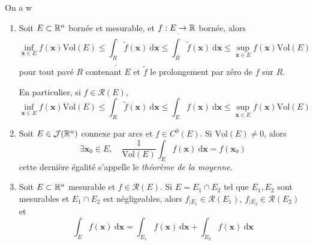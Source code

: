

\begin{thmbox}
	\begin{theorem}
		On a w
		\begin{enumerate}[start=5]
		
		\item Soit $E \subset \mathbb R^n$ bornée et mesurable, et $f : E \to \mathbb R$ bornée, alors
		\[
		\inf_{\bm x \in E} f(\bm x) \mathrm{Vol}(E) \leqslant \underline{\int_R} \tilde f(\bm x) ~\mathrm d \bm x \leqslant \overline{\int_R} \tilde f(\bm x) ~\mathrm d \bm x \leqslant \sup_{\bm x \in E} f(\bm x) \mathrm{Vol}(E)
		\]
		pour tout pavé $R$ contenant $E$ et $\tilde f$ le prolongement par zéro de $f$ sur $R$.
		
		En particulier, si $f \in \mathcal R(E)$,
		\[
		\inf_{\bm x \in E} f(\bm x) \mathrm{Vol}(E) \leqslant \int_R \tilde f(\bm x) ~\mathrm d \bm x \leqslant \int_E f(\bm x) ~\mathrm d \bm x \leqslant \sup_{\bm x \in E} f(\bm x) \mathrm{Vol}(E)
		\]
		\item Soit $E \in \mathcal J(\mathbb R^n)$ connexe par arcs et $f \in C^0(E)$. Si $\mathrm{Vol}(E) \neq 0$, alors
		\[
		\exists \bm x_0 \in E, \quad \frac{1}{\mathrm{Vol}(E)} \int_E f(\bm x)~\mathrm d \bm x = f(\bm x_0)
		\]
		cette dernière égalité s'appelle le \emph{théorème de la moyenne}.
		\item Soit $E \subset \mathbb R^n$ mesurable et $f \in \mathcal R(E)$. Si $E = E_1 \cap E_2$ tel que $E_1, E_2$ sont mesurables et $E_1\cap E_2$ est négligeables, alors $f_{|E_1} \in \mathcal R(E_1), ~ f_{| E_2} \in \mathcal R(E_2)$ et
		\[
		\int_E f(\bm x) ~\mathrm d \bm x = \int_{E_1} f(\bm x) ~\mathrm d \bm x + \int_{E_2} f(\bm x) ~\mathrm d \bm x 
		\]
		\end{enumerate}
	\end{theorem}
\end{thmbox}

